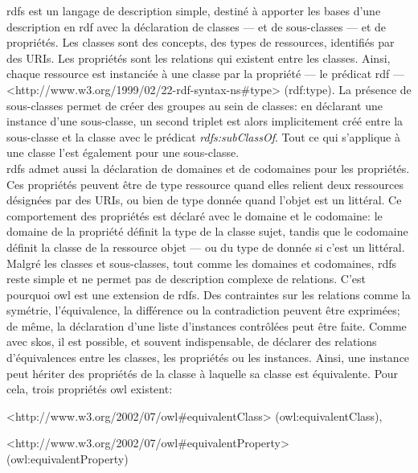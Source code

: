 \ac{rdfs} est un langage de description simple, destiné à apporter les bases d'une description en \ac{rdf} avec la déclaration de classes --- et de sous-classes --- et de propriétés. Les classes sont des concepts, des types de ressources, identifiés par des URIs. Les propriétés sont les relations qui existent entre les classes. Ainsi, chaque ressource est instanciée à une classe par la propriété --- le prédicat \ac{rdf} --- <http://www.w3.org/1999/02/22-rdf-syntax-ns\#type> (rdf:type). La présence de sous-classes permet de créer des groupes au sein de classes: en déclarant une instance d'une sous-classe, un second triplet est alors implicitement créé entre la sous-classe et la classe avec le prédicat \textit{rdfs:subClassOf}. Tout ce qui s'applique à une classe l'est également pour une sous-classe.\\

\ac{rdfs} admet aussi la déclaration de domaines et de codomaines pour les propriétés. Ces propriétés peuvent être de type ressource quand elles relient deux ressources désignées par des URIs, ou bien de type donnée quand l'objet est un littéral. Ce comportement des propriétés est déclaré avec le domaine et le codomaine: le domaine de la propriété définit la type de la classe sujet, tandis que le codomaine définit la classe de la ressource objet --- ou du type de donnée si c'est un littéral.\\

Malgré les classes et sous-classes, tout comme les domaines et codomaines, \ac{rdfs} reste simple et ne permet pas de description complexe de relations. C'est pourquoi \ac{owl} est une extension de \ac{rdfs}. Des contraintes sur les relations comme la symétrie, l'équivalence, la différence ou la contradiction peuvent être exprimées; de même, la déclaration d'une liste d'instances contrôlées peut être faite. Comme avec \ac{skos}, il est possible, et souvent indispensable, de déclarer des relations d'équivalences entre les classes, les propriétés ou les instances. Ainsi, une instance peut hériter des propriétés de la classe à laquelle sa classe est équivalente. Pour cela, trois propriétés \ac{owl} existent: 

\noindent<http://www.w3.org/2002/07/owl\#equivalentClass> (owl:equivalentClass),

\noindent <http://www.w3.org/2002/07/owl\#equivalentProperty> (owl:equivalentProperty)

